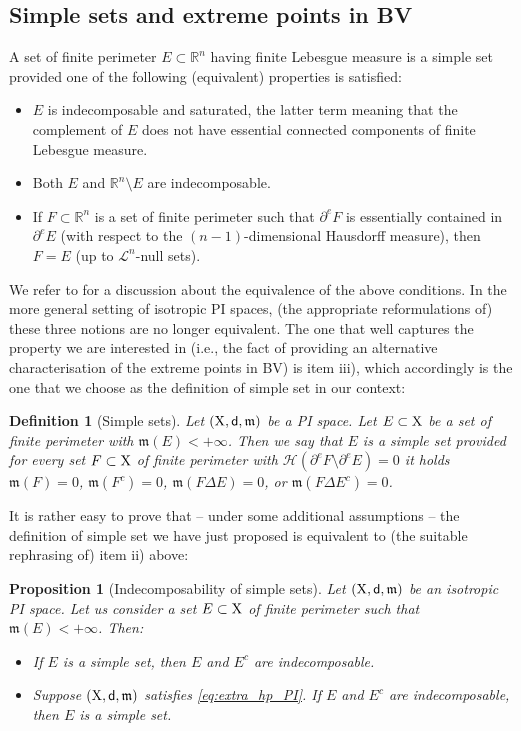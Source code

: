 \documentclass[reqno]{amsart}
\numberwithin{equation}{section}
\newcommand{\R}{\mathbb{R}}
\newcommand{\X}{{\rm X}}
\newcommand{\sfd}{{\sf d}}
\newcommand{\mm}{\mathfrak m}
\newcommand{\1}{\mathbbm 1}
\renewcommand{\H}{{\mathcal H}}
\newtheorem{proposition}[theorem]{Proposition}
\newtheorem{definition}[theorem]{Definition}
\begin{document}
\subsection{Simple sets and extreme points in BV}\label{ss:simple_and_extreme}
%
%
A set of finite perimeter \(E\subset\R^n\) having finite Lebesgue measure is a
simple set provided one of the following (equivalent) properties is satisfied:
\begin{itemize}
\item[\(\rm i)\)] \(E\) is indecomposable and saturated, the latter term
meaning that the complement of \(E\) does not have essential connected
components of finite Lebesgue measure.
\item[\(\rm ii)\)] Both \(E\) and \(\R^n\setminus E\) are indecomposable.
\item[\(\rm iii)\)] If \(F\subset\R^n\) is a set of finite perimeter
such that \(\partial^e F\) is essentially contained in \(\partial^e E\)
(with respect to the \((n-1)\)-dimensional Hausdorff measure),
then \(F=E\) (up to \(\mathcal L^n\)-null sets).
\end{itemize}
We refer to \cite[Section 5]{ACMM01} for a discussion about the equivalence
of the above conditions. In the more general setting of isotropic PI spaces,
(the appropriate reformulations of) these three notions are no longer equivalent.
The one that well captures the property we are interested in (i.e., the
fact of providing an alternative characterisation of the extreme points in BV)
is item iii), which accordingly is the one that we choose as the definition of
simple set in our context:
%
%
\begin{definition}[Simple sets]\label{def:simple_sets}
Let \((\X,\sfd,\mm)\) be a PI space. Let \(E\subset\X\) be a set of finite
perimeter with \(\mm(E)<+\infty\). Then we say that \(E\) is a \emph{simple set}
provided for every set \(F\subset\X\) of finite perimeter with
\(\H(\partial^e F\setminus\partial^e E)=0\) it holds
\(\mm(F)=0\), \(\mm(F^c)=0\), \(\mm(F\Delta E)=0\), or \(\mm(F\Delta E^c)=0\).
\end{definition}
%
%
It is rather easy to prove that -- under some additional assumptions --
the definition of simple set we have just proposed is equivalent to
(the suitable rephrasing of) item ii) above:
%
%
\begin{proposition}[Indecomposability of simple sets]\label{prop:properties_simple}
Let \((\X,\sfd,\mm)\) be an isotropic PI space. Let us consider a set
\(E\subset\X\) of finite perimeter such that \(\mm(E)<+\infty\). Then:
\begin{itemize}
\item[\(\rm i)\)] If \(E\) is a simple set, then \(E\) and \(E^c\) are indecomposable.
\item[\(\rm ii)\)] Suppose \((\X,\sfd,\mm)\) satisfies \eqref{eq:extra_hp_PI}.
If \(E\) and \(E^c\) are indecomposable, then \(E\) is a simple set.
\end{itemize}
\end{proposition}
\end{document}
